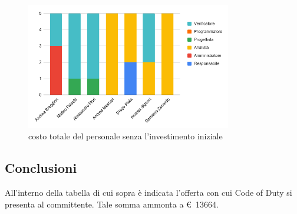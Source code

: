         \def\salarycontent{
            {Amministratore,54,20,1080},
            {Analista,41,25,1025},
            {Progettista,192,22,4224},
            {Programmatore,211,15,3165},
            {Responsabile,41,30,1230},
            {Verificatore,196,15,2940},
            {Totale,735,127,13664},
        }
        
        \begin{figure}[H]
            \centering
            \includegraphics[width=0.8\textwidth]{source/img/consolidamento_orari.png}
            \caption{costo totale del personale senza l'investimento iniziale}
        \end{figure}
    \subsection{Conclusioni}
    All'interno della tabella di cui sopra è indicata l'offerta con cui Code of Duty si presenta al committente. Tale somma ammonta a \euro\ 13664.
